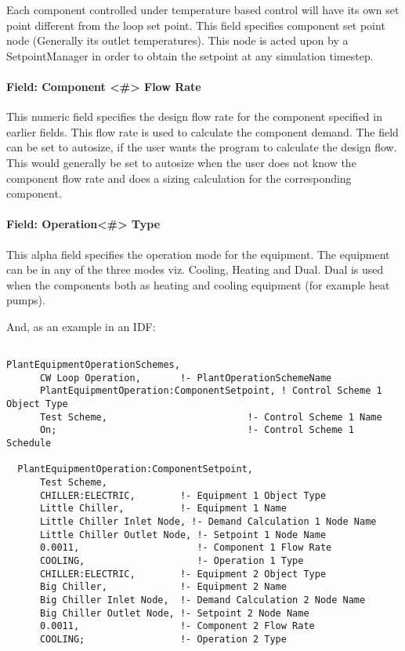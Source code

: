 Each component controlled under temperature based control will have its own set point different from the loop set point. This field specifies component set point node (Generally its outlet temperatures). This node is acted upon by a SetpointManager in order to obtain the setpoint at any simulation timestep.

\paragraph{Field: Component \textless{}\#\textgreater{} Flow Rate}\label{field-component-flow-rate}

This numeric field specifies the design flow rate for the component specified in earlier fields. This flow rate is used to calculate the component demand. The field can be set to autosize, if the user wants the program to calculate the design flow. This would generally be set to autosize when the user does not know the component flow rate and does a sizing calculation for the corresponding component.

\paragraph{Field: Operation\textless{}\#\textgreater{} Type}\label{field-operation-type}

This alpha field specifies the operation mode for the equipment. The equipment can be in any of the three modes viz. Cooling, Heating and Dual. Dual is used when the components both as heating and cooling equipment (for example heat pumps).

And, as an example in an IDF:

\begin{lstlisting}

PlantEquipmentOperationSchemes,
      CW Loop Operation,       !- PlantOperationSchemeName
      PlantEquipmentOperation:ComponentSetpoint, ! Control Scheme 1 Object Type
      Test Scheme,                         !- Control Scheme 1 Name
      On;                                  !- Control Scheme 1 Schedule

  PlantEquipmentOperation:ComponentSetpoint,
      Test Scheme,
      CHILLER:ELECTRIC,        !- Equipment 1 Object Type
      Little Chiller,          !- Equipment 1 Name
      Little Chiller Inlet Node, !- Demand Calculation 1 Node Name
      Little Chiller Outlet Node, !- Setpoint 1 Node Name
      0.0011,                     !- Component 1 Flow Rate
      COOLING,                    !- Operation 1 Type
      CHILLER:ELECTRIC,        !- Equipment 2 Object Type
      Big Chiller,             !- Equipment 2 Name
      Big Chiller Inlet Node,  !- Demand Calculation 2 Node Name
      Big Chiller Outlet Node, !- Setpoint 2 Node Name
      0.0011,                  !- Component 2 Flow Rate
      COOLING;                 !- Operation 2 Type
\end{lstlisting}

